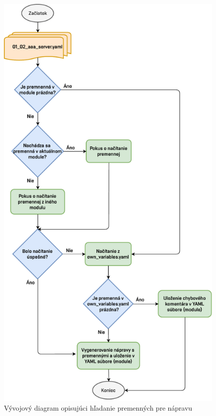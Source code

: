 \begin{figure}[H]
	\begin{center}
		\vspace*{-1cm}\includegraphics[scale=0.87]{obrazky/variables_fix.pdf}
	\end{center}
	\caption[Vývojový diagram opisujúci hľadanie premenných pre nápravu]{Vývojový diagram opisujúci hľadanie premenných pre nápravu}
	\label{variables_fix}
\end{figure}


